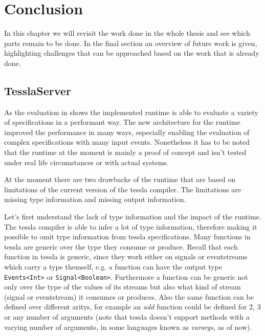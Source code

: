 %
\chapter{Conclusion}
\label{sec:conclusion}

In this chapter we will revisit the work done in the whole thesis and see which parts remain to be done.
In the final section an overview of future work is given, highlighting challenges that can be approached based on the work that is already done.

\section{TesslaServer}

As the evaluation in  shows the implemented runtime is able to evaluate a variety of specifications in a performant way.
The new architecture for the runtime improved the performance in many ways, especially enabling the evaluation of complex specifications with many input events.
Nonetheless it has to be noted that the runtime at the moment is mainly a proof of concept and isn't tested under real life circumstances or with actual systems.

At the moment there are two drawbacks of the runtime that are based on limitations of the current version of the \gls{tessla} compiler.
The limitations are missing type information and missing output information.

Let's first understand the lack of type information and the impact of the runtime.
The \gls{tessla} compiler is able to infer a lot of type information, therefore making it possible to omit type information from \gls{tessla} specifications.
Many functions in \gls{tessla} are generic over the type they consume or produce.
Recall that each function in \gls{tessla} is generic, since they work either on signals or eventstreams which carry a type themself, e.g. a function can have the output type \lstinline{Events<Int>} or \lstinline{Signal<Boolean>}.
Furthermore a function can be generic not only over the type of the values of its streams but also what kind of stream (signal or eventstream) it consumes or produces.
Also the same function can be defined over different aritys, for example an \emph{add} function could be defined for 2, 3 or any number of arguments (note that \gls{tessla} doesn't support methods with a varying number of arguments, in some languages known as \emph{varargs}, as of now).

